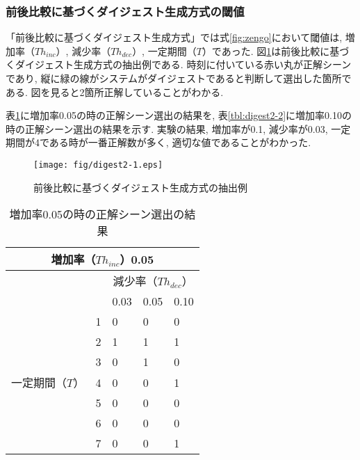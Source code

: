 \newpage

\subsubsection{前後比較に基づくダイジェスト生成方式の閾値}
「前後比較に基づくダイジェスト生成方式」では式\ref{fig:zengo}において閾値は, 増加率（$Th_{inc}$）, 減少率（$Th_{dec}$）, 一定期間（$T$）であった. 図\ref{fig:digest2-1}は前後比較に基づくダイジェスト生成方式の抽出例である. 時刻に付いている赤い丸が正解シーンであり, 縦に緑の線がシステムがダイジェストであると判断して選出した箇所である. 図を見ると2箇所正解していることがわかる.

表\ref{tbl:digest2-1}に増加率0.05の時の正解シーン選出の結果を, 表\ref{tbl:digest2-2}に増加率0.10の時の正解シーン選出の結果を示す. 実験の結果, 増加率が0.1, 減少率が0.03, 一定期間が4である時が一番正解数が多く, 適切な値であることがわかった.

\begin{figure}[h]
  \centering
  \texttt{[image: fig/digest2-1.eps]}
  \caption{前後比較に基づくダイジェスト生成方式の抽出例}
  \label{fig:digest2-1}
\end{figure}

\begin{table}[h]
  \caption{増加率0.05の時の正解シーン選出の結果}
  \label{tbl:digest2-1}
  \centering
      {\small
        \begin{tabular}{|l|l||l|l|l|} \hline
          \multicolumn{5}{|c|}{増加率（$Th_{inc}$）0.05} \\ \hline
          & & \multicolumn{3}{c|}{減少率（$Th_{dec}$）} \\ \hline
          & & 0.03 & 0.05 & 0.10 \\ \hline \hline \cline{2-5}
          & 1 & 0 & 0 & 0 \\ \cline{2-5}
          & 2 & 1 & 1 & 1 \\ \cline{2-5}
          & 3 & 0 & 1 & 0 \\ \cline{2-5}
          一定期間（$T$）& 4 & 0 & 0 & 1 \\ \cline{2-5}
          & 5 & 0 & 0 & 0 \\ \cline{2-5}
          & 6 & 0 & 0 & 0 \\ \cline{2-5}
          & 7 & 0 & 0 & 1 \\ \cline{2-5}
          \hline
        \end{tabular}
      }
\end{table}

